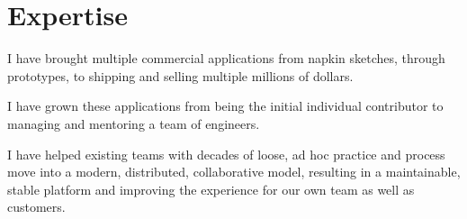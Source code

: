 \documentclass[letterpaper,10pt]{article}
\begin{document}


  
  \section{Expertise}

  \begin{resume_list}
    \item I have brought multiple commercial applications from napkin sketches, through prototypes, to shipping and selling multiple millions of dollars.
    \vspace{3pt}
    \item I have grown these applications from being the initial individual contributor to managing and mentoring a team of engineers.
    \vspace{3pt}
    \item I have helped existing teams with decades of loose, ad hoc practice and process move into a modern, distributed, collaborative model, resulting in a maintainable, stable platform and improving the experience for our own team as well as customers.
  \end{resume_list}


\end{document}
